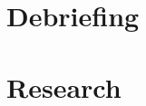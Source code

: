 \documentclass[12pt,a4paper]{article}
\begin{document}
\tableofcontents

\section{Debriefing}




\section{Research}
\end{document}
